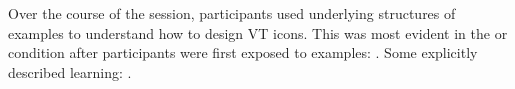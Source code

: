          
    	
    	
    	
	
    
    
    

   
   
   
    Over the course of the session, participants used %
    underlying structures of examples to understand how to design VT icons. %
    This was most evident in the \none or \lo condition after participants were first  exposed to examples: 
    .
    Some %
    explicitly described learning: %
    .

